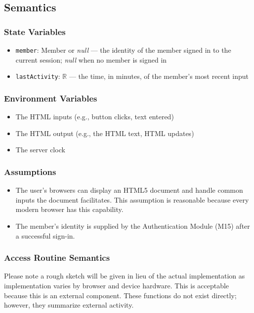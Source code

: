 \documentclass[12pt, titlepage]{article}
\begin{document}
\subsection{Semantics}

\subsubsection{State Variables}
\begin{itemize}
  \item \texttt{member}: Member or \textit{null} --- the identity of the member signed in to the current session; \textit{null} when no member is signed in
  \item \texttt{lastActivity}: $\mathbb{R}$ --- the time, in minutes, of the member's most recent input
\end{itemize}

\subsubsection{Environment Variables}
\begin{itemize}
  \item The HTML inputs (e.g., button clicks, text entered)
  \item The HTML output (e.g., the HTML text, HTML updates)
  \item The server clock
\end{itemize}

\subsubsection{Assumptions}
\begin{itemize}
  \item The user's browsers can display an HTML5 document and handle common inputs the document facilitates. This assumption is reasonable because every modern browser has this capability.
  \item The member's identity is supplied by the Authentication Module (M15) after a successful sign-in.
\end{itemize}

\subsubsection{Access Routine Semantics}
Please note a rough sketch will be given in lieu of the actual implementation as implementation
varies by browser and device hardware. This is acceptable because this is an external component.
These functions do not exist directly; however, they summarize external activity.
\end{document}
